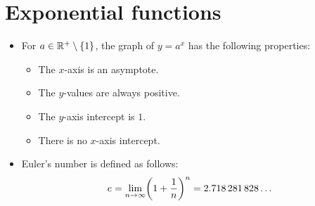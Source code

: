 \documentclass[12pt,a4paper,titlepage]{article}
\DeclarePairedDelimiter {\pars}  {  (      }     {  )      }
\DeclarePairedDelimiter {\curls} { \{      }     { \}      }
\begin{document}
            \pagebreak
        
        \section{Exponential functions}
            
            \begin{SummaryBox}[title=Exponential function characteristics]
                \begin{itemize}[leftmargin=*]
                    \item For $a \in \mathbb{R}^+ \setminus \curls{1}$, the graph of $y=a^x$ has the following properties:
                    \begin{multicols}{2}
                        \begin{itemize}[topsep=0pt]
                            \item The $x$-axis is an asymptote.
                            \item The $y$-values are always positive.
                            \item The $y$-axis intercept is $1$.
                            \item There is no $x$-axis intercept.
                        \end{itemize}
                    \end{multicols}
                \end{itemize}
            \end{SummaryBox}
            
            \begin{SummaryBox}[title=Euler's number --- \texorpdfstring{$\bm{e}$}{$e$}, list text={Euler's number --- $e$}]
                \begin{itemize}[leftmargin=*]
                    \item Euler's number is defined as follows:
                    \[
                        e = \lim\limits_{n \to \infty} \pars*{1+\frac{1}{n}}^n = \num{2.718281828}\dots
                    \]
                \end{itemize}
            \end{SummaryBox}
            
\end{document}
